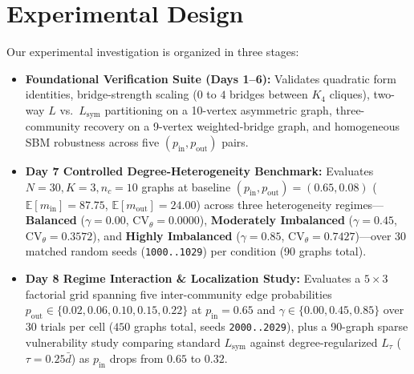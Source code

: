 \documentclass[10pt,twocolumn,a4paper]{article}
\begin{document}
\section{Experimental Design}
Our experimental investigation is organized in three stages:
\begin{itemize}\setlength{\itemsep}{1pt}\setlength{\parskip}{0pt}
    \item \textbf{Foundational Verification Suite (Days 1--6):} Validates quadratic form identities, bridge-strength scaling ($0$ to $4$ bridges between $K_4$ cliques), two-way $L$ vs.\ $L_{\mathrm{sym}}$ partitioning on a 10-vertex asymmetric graph, three-community recovery on a 9-vertex weighted-bridge graph, and homogeneous SBM robustness across five $(p_{\mathrm{in}}, p_{\mathrm{out}})$ pairs.
    \item \textbf{Day 7 Controlled Degree-Heterogeneity Benchmark:} Evaluates $N=30, K=3, n_c=10$ graphs at baseline $(p_{\mathrm{in}}, p_{\mathrm{out}}) = (0.65, 0.08)$ ($\mathbb{E}[m_{\mathrm{in}}] = 87.75$, $\mathbb{E}[m_{\mathrm{out}}] = 24.00$) across three heterogeneity regimes---\textbf{Balanced} ($\gamma=0.00$, $\mathrm{CV}_\theta = 0.0000$), \textbf{Moderately Imbalanced} ($\gamma=0.45$, $\mathrm{CV}_\theta = 0.3572$), and \textbf{Highly Imbalanced} ($\gamma=0.85$, $\mathrm{CV}_\theta = 0.7427$)---over 30 matched random seeds (\texttt{1000..1029}) per condition (90 graphs total).
    \item \textbf{Day 8 Regime Interaction \& Localization Study:} Evaluates a $5 \times 3$ factorial grid spanning five inter-community edge probabilities $p_{\mathrm{out}} \in \{0.02, 0.06, 0.10, 0.15, 0.22\}$ at $p_{\mathrm{in}} = 0.65$ and $\gamma \in \{0.00, 0.45, 0.85\}$ over 30 trials per cell ($450$ graphs total, seeds \texttt{2000..2029}), plus a 90-graph sparse vulnerability study comparing standard $L_{\mathrm{sym}}$ against degree-regularized $L_\tau$ ($\tau = 0.25\bar{d}$) as $p_{\mathrm{in}}$ drops from $0.65$ to $0.32$.
\end{itemize}
\end{document}

